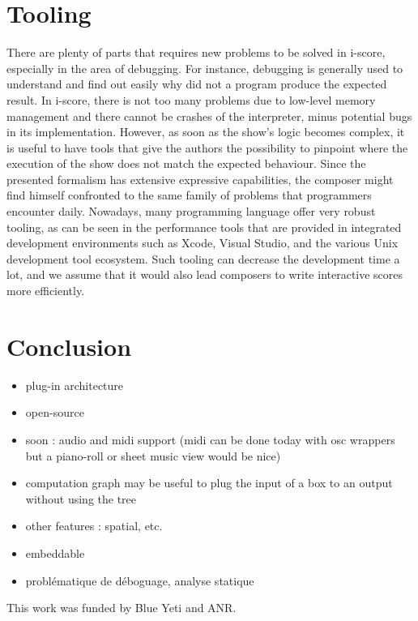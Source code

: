 \documentclass{article}
\begin{document}
\section{Tooling}
There are plenty of parts that requires new problems to be solved in i-score, especially in the area of debugging. 
For instance, debugging is generally used to understand and find out easily why did not a program produce the expected result.
In i-score, there is not too many problems due to low-level memory management and there cannot be crashes of the interpreter, minus potential bugs in its implementation. 
However, as soon as the show's logic becomes complex, it is useful to have tools that give the authors the possibility to pinpoint where the execution of the show does not match the expected behaviour.
Since the presented formalism has extensive expressive capabilities, the composer might find himself confronted to the same family of problems that programmers encounter daily.
Nowadays, many programming language offer very robust tooling, as can be seen in the performance tools that are provided in integrated development environments such as Xcode, Visual Studio, and the various Unix development tool ecosystem\cite{spinellis2014software}.
Such tooling can decrease the development time a lot, and we assume that it would also lead composers to write interactive scores more efficiently.

\section{Conclusion}
\begin{itemize}
\item plug-in architecture
\item open-source
\item soon : audio and midi support (midi can be done today with osc wrappers but a piano-roll or sheet music view would be nice)
\item computation graph may be useful to plug the input of a box  to an output without using the tree
\item other features : spatial, etc.
\item embeddable 
\item problématique de déboguage, analyse statique
\end{itemize}
\begin{acknowledgments}
    This work was funded by Blue Yeti and ANR.
\end{acknowledgments} 


\end{document}

